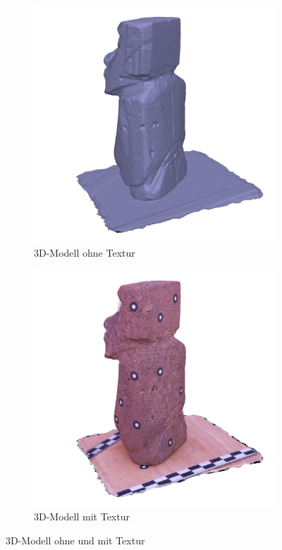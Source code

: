 \documentclass[./00PhotoBox.tex]{subfiles}
\begin{document}
\begin{figure}
    \centering
    \begin{subfigure}{0.49\textwidth}
        \includegraphics[width=1\linewidth]{img/2_grundlagen/solid.jpg}
        \centering
        \caption{3D-Modell ohne Textur}
        \label{img:ohne_textur}
    \end{subfigure}
    \begin{subfigure}{0.49\textwidth}
        \includegraphics[width=1\linewidth]{img/2_grundlagen/textur.jpg}
        \centering
        \caption{3D-Modell mit Textur}
        \label{img:mit_textur}
    \end{subfigure}
    \caption{3D-Modell ohne und mit Textur}
    \label{img:texturierung}
\end{figure}

\biblio
\end{document}
